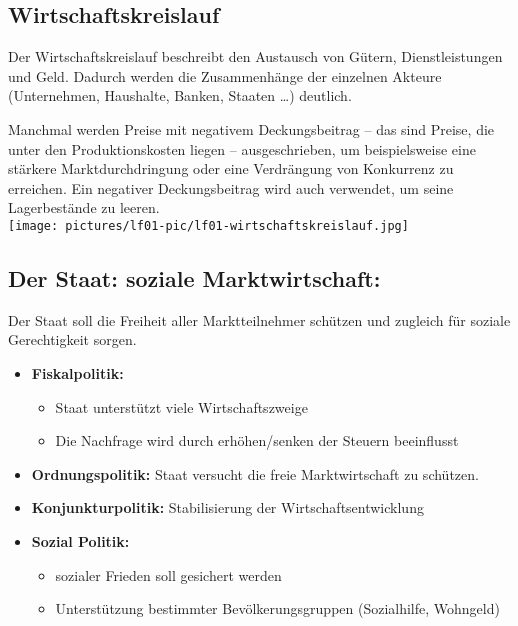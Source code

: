 
\subsection{Wirtschaftskreislauf}

Der Wirtschaftskreislauf beschreibt den Austausch von Gütern, Dienstleistungen und Geld. Dadurch werden die Zusammenhänge der einzelnen Akteure (Unternehmen, Haushalte, Banken, Staaten \dots) deutlich.

Manchmal werden Preise mit negativem Deckungsbeitrag -- das sind Preise, die unter den Produktionskosten liegen -- ausgeschrieben, um beispielsweise eine stärkere Marktdurchdringung oder eine Verdrängung von Konkurrenz zu erreichen. Ein negativer Deckungsbeitrag wird auch verwendet, um seine Lagerbestände zu leeren. \\
\texttt{[image: pictures/lf01-pic/lf01-wirtschaftskreislauf.jpg]}


\subsection{Der Staat: soziale Marktwirtschaft:}

Der Staat soll die Freiheit aller Marktteilnehmer schützen und zugleich für soziale Gerechtigkeit sorgen.

\begin{itemize}
	\item \textbf{Fiskalpolitik:} 
	\begin{itemize}
		\item Staat unterstützt viele Wirtschaftszweige
		\item Die Nachfrage wird durch erhöhen/senken der Steuern beeinflusst
	\end{itemize}
	\item \textbf{Ordnungspolitik:} Staat versucht die freie Marktwirtschaft zu schützen.
	\item \textbf{Konjunkturpolitik:} Stabilisierung der Wirtschaftsentwicklung
	\item \textbf{Sozial Politik:} 
	\begin{itemize}
		\item sozialer Frieden soll gesichert werden
		\item Unterstützung bestimmter Bevölkerungsgruppen (Sozialhilfe, Wohngeld)
	\end{itemize}
\end{itemize}
	
